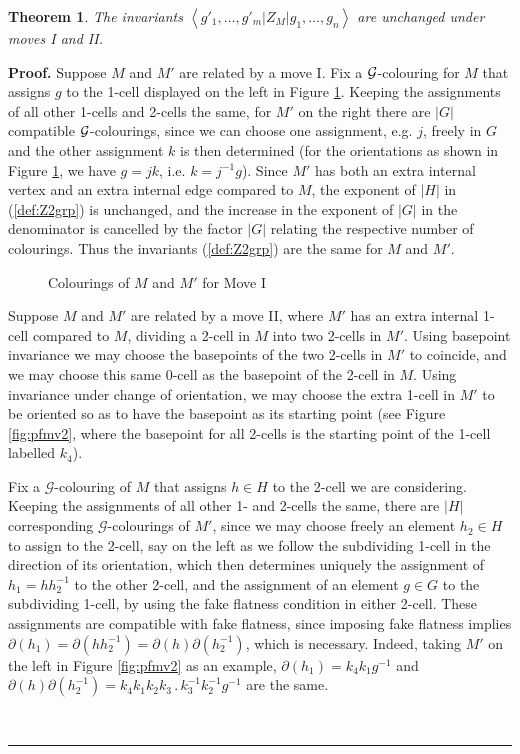 \documentclass[a4paper,11pt]{article}
\newtheorem{Theorem}{Theorem}[section]
\newenvironment{Proof}[1][Proof]{\textbf{#1.} }{\ \rule{0.5em}{0.5em}}
\def \G {\mathcal{G}}
\begin{document}
\begin{Theorem}
The invariants $\left \langle g'_1,\dots , g'_m \left | Z_M \right |g_1,\dots , g_n   \right \rangle$ are unchanged under moves I and II.
\end{Theorem}
%
\begin{Proof} Suppose $M$ and $M'$ are related by a move I. Fix a $\cal G$-colouring for $M$ that assigns $g$ to the 1-cell displayed on the left in Figure \ref{fig:pfmv1}. Keeping the assignments of all other 1-cells and 2-cells the same, for $M'$ on the right there are $|G|$ compatible $\cal G$-colourings, since we can choose one assignment, e.g. $j$, freely in $G$ and the other assignment $k$ is then determined (for the orientations as shown in Figure \ref{fig:pfmv1}, we have $g=jk$, i.e. $k=j^{-1}g$). Since $M'$ has both an extra internal vertex and an extra internal edge compared to $M$, the exponent of $|H|$ in (\ref{def:Z2grp}) is unchanged, and the increase in the exponent of $|G|$ in the denominator is cancelled by the factor $|G|$ relating the respective number of colourings. Thus the invariants (\ref{def:Z2grp}) are the same for $M$ and $M'$.


\begin{figure}[htbp] 
\centerline{\relabelbox 
\epsfxsize 8cm
\endrelabelbox}
\caption{Colourings of $M$ and $M'$ for Move I}
\label{fig:pfmv1}
\end{figure}

Suppose $M$ and $M'$ are related by a move II, where $M'$ has an extra internal 1-cell compared to $M$, dividing a 2-cell in $M$ into two 2-cells in $M'$. Using basepoint invariance we may choose the basepoints of the two 2-cells in $M'$ to coincide, and we may choose this same 0-cell as the basepoint of the 2-cell in $M$. Using invariance under change of orientation, we may choose the extra 1-cell in $M'$ to be oriented so as to have the basepoint as its starting point  (see Figure \ref{fig:pfmv2}, where the basepoint for all 2-cells is the starting point of the 1-cell labelled $k_4$).

Fix a $\G$-colouring of $M$ that assigns $h\in H$ to the 2-cell we are considering. Keeping the assignments of all other 1- and 2-cells the same, there are $|H|$ corresponding $\G$-colourings of $M'$, since we may choose freely an element $h_2\in H$ to assign to the 2-cell, say on the left as we follow the subdividing 1-cell in the direction of its orientation, which then determines uniquely the assignment of 
$h_1=h h_2^{-1}$ to the other 2-cell, and the assignment of an element $g\in G$ to the subdividing 1-cell, by using the fake flatness condition in either 2-cell. These assignments are compatible with fake flatness, since imposing fake flatness implies $\partial(h_1)=\partial(hh_2^{-1})= \partial(h)\partial(h_2^{-1})$, which is necessary. Indeed, taking $M'$ on the left in Figure \ref{fig:pfmv2} as an example, $\partial(h_1)=k_4k_1g^{-1}$ and $\partial(h) \partial(h_2^{-1}) = k_4k_1k_2k_3 \, . \, k_3^{-1}k_2^{-1}g^{-1}$ are the same.


\end{Proof}
\end{document}
